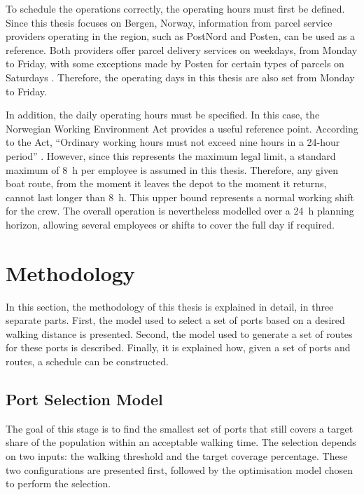 \documentclass[12pt]{article}
\begin{document}
To schedule the operations correctly, the operating hours must first be defined. Since this thesis focuses on Bergen, Norway, information from parcel service providers operating in the region, such as PostNord and Posten, can be used as a reference. Both providers offer parcel delivery services on weekdays, from Monday to Friday, with some exceptions made by Posten for certain types of parcels on Saturdays \parencite{posten_hours,portnord_hours}. Therefore, the operating days in this thesis are also set from Monday to Friday.

In addition, the daily operating hours must be specified. In this case, the Norwegian Working Environment Act provides a useful reference point. According to the Act, \enquote{Ordinary working hours must not exceed nine hours in a 24-hour period} \cite{arbeidsmiljoloven_10_4}. However, since this represents the maximum legal limit, a standard maximum of \qty{8}{\hour} per employee is assumed in this thesis. Therefore, any given boat route, from the moment it leaves the depot to the moment it returns, cannot last longer than \qty{8}{\hour}. This upper bound represents a normal working shift for the crew. The overall operation is nevertheless modelled over a \qty{24}{\hour} planning horizon, allowing several employees or shifts to cover the full day if required.

\section{Methodology}
\label{sec:methodology}

In this section, the methodology of this thesis is explained in detail, in three separate parts. First, the model used to select a set of ports based on a desired walking distance is presented. Second, the model used to generate a set of routes for these ports is described. Finally, it is explained how, given a set of ports and routes, a schedule can be constructed.

\subsection{Port Selection Model}
\label{subsec:port-selection-model}

The goal of this stage is to find the smallest set of ports that still covers a target share of the population within an acceptable walking time. The selection depends on two inputs: the walking threshold and the target coverage percentage. These two configurations are presented first, followed by the optimisation model chosen to perform the selection.
\end{document}
